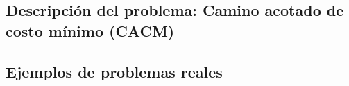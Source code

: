 \subsection{Descripción del problema: Camino acotado de costo mínimo (CACM)}
\label{sub:introduccion-descripcion}


\subsection{Ejemplos de problemas reales}
\label{sub:introduccion-ejemplos}

